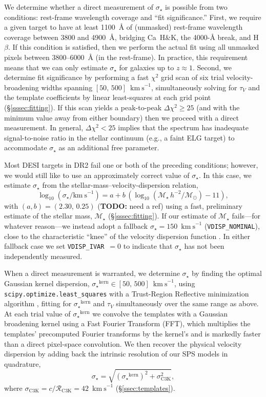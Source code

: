 \documentclass[modern,linenumbers]{aastex701}
\newcommand{\todo}[1]{{\color{red}\textbf{TODO:} #1}}
\newcommand{\kms}{\ensuremath{\mathrm{km~s}^{-1}}}
\newcommand{\vdisp}{\ensuremath{\sigma_\star}}
\newcommand{\tauv}{\ensuremath{\tau_V}}
\newcommand{\Mstar}{\ensuremath{\mathcal{M}_{\star}}}
\newcommand{\msun}{\ensuremath{\mathcal{M}_{\odot}}}
\newcommand{\logmstar}{\ensuremath{\log_{10}(\Mstar\,h^{-2}/\msun)}}
\begin{document}
We determine whether a direct measurement of \vdisp{} is possible from
two conditions: rest-frame wavelength coverage and ``fit
significance.'' First, we require a given target to have at least
1100~\AA{} of (unmasked) rest-frame wavelength coverage between 3800
and 4900~\AA, bridging Ca~H\&K, the 4000-\AA{} break, and H$\beta$. If
this condition is satisfied, then we perform the actual fit using all
unmasked pixels between 3800--6000~\AA{} (in the rest-frame). In
practice, this requirement means that we can only estimate \vdisp{}
for galaxies up to $z\approx1$. Second, we determine fit significance
by performing a fast $\chi^2$ grid scan of six trial
velocity-broadening widths spanning $[50,\,500]$~\kms{},
simultaneously solving for \tauv{} and the template coefficients by
linear least-squares at each grid point
(\S\ref{sssec:fitting}). If this scan yields a peak-to-peak
$\Delta\chi^2 \geq 25$ (and with the minimum value away from either
boundary) then we proceed with a direct measurement. In general,
$\Delta\chi^2 < 25$ implies that the spectrum has inadequate
signal-to-noise ratio in the stellar continuum (e.g., a faint ELG
target) to accommodate \vdisp{} as an additional free parameter.

Most DESI targets in DR2 fail one or both of the preceding conditions;
however, we would still like to use an approximately correct value of
\vdisp. In this case, we estimate \vdisp{} from the
stellar-mass--velocity-dispersion relation,
\begin{equation}
  \log_{10}(\vdisp/\kms) = a + b\,(\logmstar - 11),
  \label{eq:sigma_mstar}
\end{equation}
with $(a,b) = (2.30,\,0.25)$ (\todo{need a ref}) using a fast,
preliminary estimate of the stellar mass, \Mstar{}
(\S\ref{sssec:fitting}). If our estimate of \Mstar{} fails---for
whatever reason---we instead adopt a fallback $\vdisp = 150$~\kms{}
(\texttt{VDISP\_NOMINAL}), close to the characteristic ``knee'' of the
velocity dispersion function \citep{bezanson11a, taylor22a}. In either
fallback case we set \texttt{VDISP\_IVAR}~$=0$ to indicate that
\vdisp{} has not been independently measured.

When a direct measurement is warranted, we determine \vdisp{} by
finding the optimal Gaussian kernel dispersion,
$\vdisp^\mathrm{kern} \in [50,\,500]$~\kms{}, using
\texttt{scipy.optimize.least\_squares} with a Trust-Region Reflective
minimization algorithm \citep{branch99a}, fitting for
$\vdisp^\mathrm{kern}$ and \tauv{} simultaneously over the same range
as above. At each trial value of $\vdisp^\mathrm{kern}$ we convolve the
templates with a Gaussian broadening kernel using a Fast Fourier
Transform (FFT), which multiplies the templates' precomputed Fourier
transforms by the kernel's and is markedly faster than a direct
pixel-space convolution. We then recover the physical velocity dispersion by adding
back the intrinsic resolution of our SPS models in quadrature,
\begin{equation}
  \vdisp = \sqrt{(\vdisp^\mathrm{kern})^2 + \sigma_\mathrm{C3K}^2},
  \label{eq:vdisptot}
\end{equation}
where $\sigma_\mathrm{C3K} = c/\mathcal{R}_{\mathrm{C3K}}=42$~\kms{}
(\S\ref{ssec:templates}).
\end{document}
